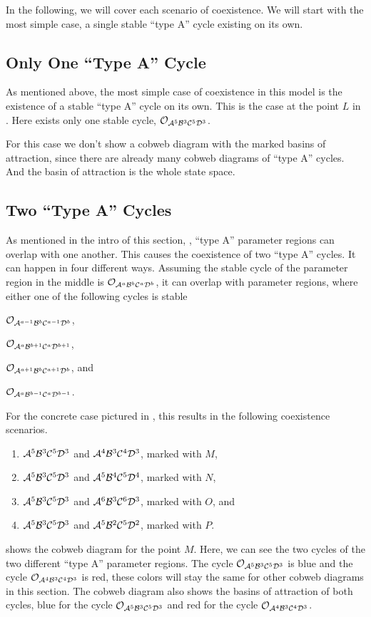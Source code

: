 In the following, we will cover each scenario of coexistence.
We will start with the most simple case, a single stable ``type A'' cycle existing on its own.

\subsection{Only One ``Type A'' Cycle}
\label{sec:arch.coex.A}

As mentioned above, the most simple case of coexistence in this model is the existence of a stable ``type A'' cycle on its own.
This is the case at the point $L$ in .
Here exists only one stable cycle, $\mathcal{O}_{\mathcal{A}^5\mathcal{B}^3\mathcal{C}^5\mathcal{D}^3}$.

For this case we don't show a cobweb diagram with the marked basins of attraction, since there are already many cobweb diagrams of ``type A'' cycles.
And the basin of attraction is the whole state space.

\subsection{Two ``Type A'' Cycles}
\label{sec:arch.coex.AA}

As mentioned in the intro of this section, , ``type A'' parameter regions can overlap with one another.
This causes the coexistence of two ``type A'' cycles.
It can happen in four different ways.
Assuming the stable cycle of the parameter region in the middle is $\mathcal{O}_{\mathcal{A}^a\mathcal{B}^b\mathcal{C}^a\mathcal{D}^b}$, it can overlap with parameter regions, where either one of the following cycles is stable
\begin{enumerate*}
	\item $\mathcal{O}_{\mathcal{A}^{a-1}\mathcal{B}^b\mathcal{C}^{a-1}\mathcal{D}^b}$,
	\item $\mathcal{O}_{\mathcal{A}^a\mathcal{B}^{b+1}\mathcal{C}^a\mathcal{D}^{b+1}}$,
	\item $\mathcal{O}_{\mathcal{A}^{a+1}\mathcal{B}^b\mathcal{C}^{a+1}\mathcal{D}^b}$, and
	\item $\mathcal{O}_{\mathcal{A}^a\mathcal{B}^{b-1}\mathcal{C}^a\mathcal{D}^{b-1}}$.
\end{enumerate*}
For the concrete case pictured in , this results in the following coexistence scenarios.
\begin{enumerate}
	\item $\mathcal{A}^5\mathcal{B}^3\mathcal{C}^5\mathcal{D}^3$ and $\mathcal{A}^4\mathcal{B}^3\mathcal{C}^4\mathcal{D}^3$, marked with $M$,
	\item $\mathcal{A}^5\mathcal{B}^3\mathcal{C}^5\mathcal{D}^3$ and $\mathcal{A}^5\mathcal{B}^4\mathcal{C}^5\mathcal{D}^4$, marked with $N$,
	\item $\mathcal{A}^5\mathcal{B}^3\mathcal{C}^5\mathcal{D}^3$ and $\mathcal{A}^6\mathcal{B}^3\mathcal{C}^6\mathcal{D}^3$, marked with $O$, and
	\item $\mathcal{A}^5\mathcal{B}^3\mathcal{C}^5\mathcal{D}^3$ and $\mathcal{A}^5\mathcal{B}^2\mathcal{C}^5\mathcal{D}^2$, marked with $P$.
\end{enumerate}
 shows the cobweb diagram for the point $M$.
Here, we can see the two cycles of the two different ``type A'' parameter regions.
The cycle $\mathcal{O}_{\mathcal{A}^5\mathcal{B}^3\mathcal{C}^5\mathcal{D}^3}$ is blue and the cycle $\mathcal{O}_{\mathcal{A}^4\mathcal{B}^3\mathcal{C}^4\mathcal{D}^3}$ is red, these colors will stay the same for other cobweb diagrams in this section.
The cobweb diagram also shows the basins of attraction of both cycles, blue for the cycle $\mathcal{O}_{\mathcal{A}^5\mathcal{B}^3\mathcal{C}^5\mathcal{D}^3}$ and red for the cycle $\mathcal{O}_{\mathcal{A}^4\mathcal{B}^3\mathcal{C}^4\mathcal{D}^3}$.

